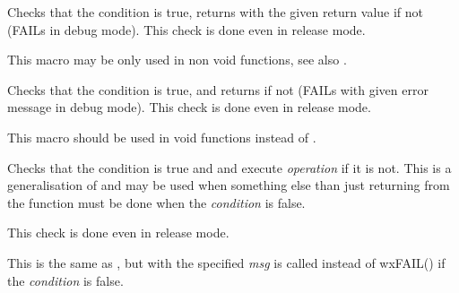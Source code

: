 
Checks that the condition is true, returns with the given return value if not (FAILs in debug mode).
This check is done even in release mode.

This macro may be only used in non void functions, see also 
.

\label{wxcheckret}


Checks that the condition is true, and returns if not (FAILs with given error
message in debug mode). This check is done even in release mode.

This macro should be used in void functions instead of 
.

\label{wxcheck2}


Checks that the condition is true and  and execute 
{\it operation} if it is not. This is a generalisation of 
 and may be used when something else than just
returning from the function must be done when the {\it condition} is false.

This check is done even in release mode.

\label{wxcheck2msg}


This is the same as , but 
 with the specified {\it msg} is called
instead of wxFAIL() if the {\it condition} is false.

